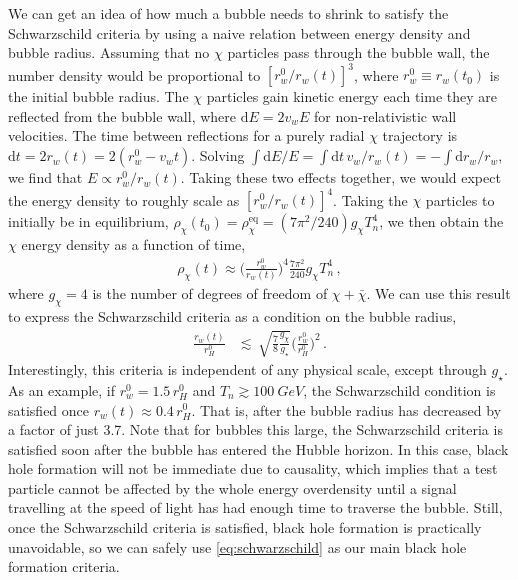 \documentclass[
onecolumn, %
11pt, %
tightenlines,
superscriptaddress, %
nofootinbib, %
preprintnumbers, %
prd %
]{revtex4-1}
\newcommand{\upd}{\mathrm d}                                          %
\begin{document}
We can get an idea of how much a bubble needs to shrink to satisfy the Schwarzschild criteria by using a naive relation between energy density and bubble radius.  Assuming that no $\chi$ particles pass through the bubble wall, the number density would be proportional to $[r_w^0/r_w(t)]^3$, where $r_w^0\equiv r_w(t_0)$ is the initial bubble radius.  The $\chi$ particles gain kinetic energy each time they are reflected from the bubble wall, where $\upd E = 2 v_w E$ for non-relativistic wall velocities. The time between reflections for a purely radial $\chi$ trajectory is $\upd t = 2 r_w(t) = 2 (r_w^0 - v_w t)$. Solving $\int \upd E/E = \int \upd t \, v_w / r_w(t) = -\!\int \upd r_w / r_w$, we find that $E \propto r_w^0/r_w(t)$.  Taking these two effects together, we would expect the energy density to roughly scale as $[r_w^0/r_w(t)]^4$.  Taking the $\chi$ particles to initially be in equilibrium, $\rho_\chi(t_0) = \rho_\chi^\text{eq} = (7 \pi^2/240) g_\chi T_n^4$, we then obtain the $\chi$ energy density as a function of time,
%
\begin{align}
    \label{eq:rho-chi}
    \rho_\chi(t) \approx \bigg( \frac{r_w^0}{r_w(t)} \bigg)^{\!4}
                     \frac{7\pi^2}{240} g_\chi T_n^4 \,,
\end{align}
%
where $g_\chi=4$ is the number of degrees of freedom of $\chi+\bar\chi$.  We can use this result to express the Schwarzschild criteria as a condition on the bubble radius, 
%
\begin{align}
\label{eq:schwarzschild-crit}
    \frac{r_w(t)}{r_H^0} &\lesssim\, \sqrt{\frac{7}{8} \frac{g_\chi}{g_\star}} \bigg(\frac{r_w^0}{r_H^0}\bigg)^{\!2} \,.
\end{align}
%
Interestingly, this criteria is independent of any physical scale, except through $g_\star$.  As an example, if $r_w^0 = 1.5\,r_H^0$ and $T_n \gtrsim \SI{100}{GeV}$, the Schwarzschild condition is satisfied once $r_w(t)\approx 0.4\,r_H^0$.  That is, after the bubble radius has decreased by a factor of just 3.7.  Note that for bubbles this large, the Schwarzschild criteria is satisfied soon after the bubble has entered the Hubble horizon.  In this case, black hole formation will not be immediate due to causality, which implies that a test particle cannot be affected by the whole energy overdensity until a signal travelling at the speed of light has had enough time to traverse the bubble. Still, once the Schwarzschild criteria is satisfied, black hole formation is practically unavoidable, so we can safely use \cref{eq:schwarzschild} as our main black hole formation criteria.
\end{document}
